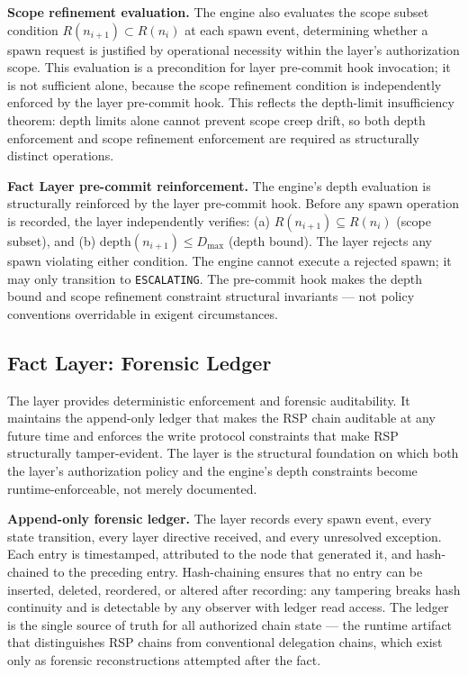 \medskip
\noindent\textbf{Scope refinement evaluation.} The \bounds{} engine also evaluates the scope subset condition $R(n_{i+1}) \subset R(n_i)$ at each spawn event, determining whether a spawn request is justified by operational necessity within the \purpose{} layer's authorization scope. This evaluation is a precondition for \fact{} layer pre-commit hook invocation; it is not sufficient alone, because the scope refinement condition is independently enforced by the \fact{} layer pre-commit hook. This reflects the depth-limit insufficiency theorem: depth limits alone cannot prevent scope creep drift, so both depth enforcement and scope refinement enforcement are required as structurally distinct operations.

\medskip
\noindent\textbf{Fact Layer pre-commit reinforcement.} The \bounds{} engine's depth evaluation is structurally reinforced by the \fact{} layer pre-commit hook. Before any spawn operation is recorded, the \fact{} layer independently verifies: (a) $R(n_{i+1}) \subseteq R(n_i)$ (scope subset), and (b) $\mathrm{depth}(n_{i+1}) \leq D_{\mathrm{max}}$ (depth bound). The \fact{} layer rejects any spawn violating either condition. The \bounds{} engine cannot execute a rejected spawn; it may only transition to \texttt{ESCALATING}. The pre-commit hook makes the depth bound and scope refinement constraint structural invariants --- not policy conventions overridable in exigent circumstances.

\subsection{Fact Layer: Forensic Ledger}
\label{sec:fact_ledger}

The \fact{} layer provides deterministic enforcement and forensic auditability. It maintains the append-only ledger that makes the RSP chain auditable at any future time and enforces the write protocol constraints that make RSP structurally tamper-evident. The \fact{} layer is the structural foundation on which both the \purpose{} layer's authorization policy and the \bounds{} engine's depth constraints become runtime-enforceable, not merely documented.

\medskip
\noindent\textbf{Append-only forensic ledger.} The \fact{} layer records every spawn event, every state transition, every \purpose{} layer directive received, and every unresolved exception. Each entry is timestamped, attributed to the node that generated it, and hash-chained to the preceding entry. Hash-chaining ensures that no entry can be inserted, deleted, reordered, or altered after recording: any tampering breaks hash continuity and is detectable by any observer with ledger read access. The ledger is the single source of truth for all authorized chain state --- the runtime artifact that distinguishes RSP chains from conventional delegation chains, which exist only as forensic reconstructions attempted after the fact.

